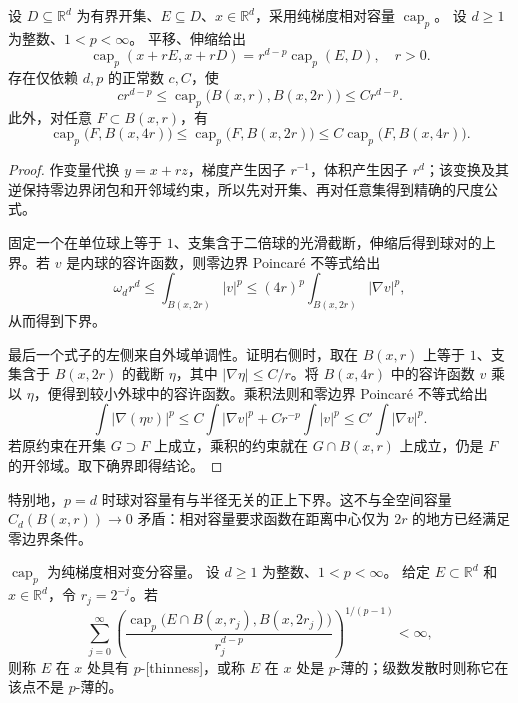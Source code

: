 \begin{proposition}\label{b1:prop:relative-capacity-scale}
设 \(D\subseteq\mathbb R^d\) 为有界开集、\(E\subseteq D\)、\(x\in\mathbb R^d\)，采用纯梯度相对容量 \(\operatorname{cap}_p\)。
设 \(d\geq1\) 为整数、\(1<p<\infty\)。
平移、伸缩给出
\[
 \operatorname{cap}_p(x+rE,x+rD)
 =r^{d-p}\operatorname{cap}_p(E,D),\quad r>0.
\]
存在仅依赖 \(d,p\) 的正常数 \(c,C\)，使
\begin{equation}\label{b1:eq:relative-ball-capacity}
 cr^{d-p}\le
 \operatorname{cap}_p\bigl(B(x,r),B(x,2r)\bigr)
 \le Cr^{d-p}.
\end{equation}
此外，对任意 \(F\subset B(x,r)\)，有
\begin{equation}\label{b1:eq:relative-outer-ball-comparison}
 \operatorname{cap}_p\bigl(F,B(x,4r)\bigr)
 \le\operatorname{cap}_p\bigl(F,B(x,2r)\bigr)
 \le C\operatorname{cap}_p\bigl(F,B(x,4r)\bigr).
\end{equation}
\end{proposition}
\begin{proof}
作变量代换 \(y=x+rz\)，梯度产生因子 \(r^{-1}\)，体积产生因子 \(r^d\)；该变换及其逆保持零边界闭包和开邻域约束，所以先对开集、再对任意集得到精确的尺度公式。

固定一个在单位球上等于 \(1\)、支集含于二倍球的光滑截断，伸缩后得到球对的上界。若 \(v\) 是内球的容许函数，则零边界 Poincaré 不等式给出
\[
 \omega_d r^d
 \le\int_{B(x,2r)}|v|^p
 \le(4r)^p\int_{B(x,2r)}|\nabla v|^p,
\]
从而得到下界。

最后一个式子的左侧来自外域单调性。证明右侧时，取在 \(B(x,r)\) 上等于 \(1\)、支集含于 \(B(x,2r)\) 的截断 \(\eta\)，其中 \(|\nabla\eta|\le C/r\)。将 \(B(x,4r)\) 中的容许函数 \(v\) 乘以 \(\eta\)，便得到较小外球中的容许函数。乘积法则和零边界 Poincaré 不等式给出
\[
 \int|\nabla(\eta v)|^p
 \le C\int|\nabla v|^p+Cr^{-p}\int|v|^p
 \le C'\int|\nabla v|^p.
\]
若原约束在开集 \(G\supset F\) 上成立，乘积的约束就在 \(G\cap B(x,r)\) 上成立，仍是 \(F\) 的开邻域。取下确界即得结论。
\end{proof}

特别地，\(p=d\) 时球对容量有与半径无关的正上下界。这不与全空间容量 \(C_d(B(x,r))\to0\) 矛盾：相对容量要求函数在距离中心仅为 \(2r\) 的地方已经满足零边界条件。

\begin{definition}\label{b1:def:p-thin-set}
\(\operatorname{cap}_p\) 为纯梯度相对变分容量。
设 \(d\geq1\) 为整数、\(1<p<\infty\)。
给定 \(E\subset\mathbb R^d\) 和 \(x\in\mathbb R^d\)，令 \(r_j=2^{-j}\)。若
\begin{equation}\label{b1:eq:p-wiener-series}
 \sum_{j=0}^{\infty}
 \left(
 \frac{\operatorname{cap}_p\bigl(E\cap B(x,r_j),B(x,2r_j)\bigr)}
 {r_j^{d-p}}
 \right)^{1/(p-1)}<\infty,
\end{equation}
则称 \(E\) 在 \(x\) 处具有 \(p\)-[thinness]，或称 \(E\) 在 \(x\) 处是 \(p\)-薄的；级数发散时则称它在该点不是 \(p\)-薄的。
\end{definition}

